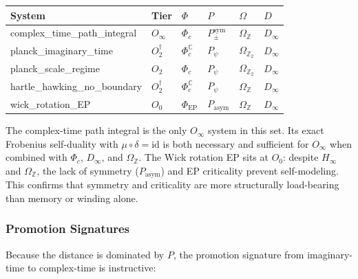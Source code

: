 \documentclass[12pt,a4paper]{article}
\begin{document}
\begin{table}[htbp]
\centering
\small
{}
\begin{tabularx}{\textwidth}{>{\centering\arraybackslash}X >{\centering\arraybackslash}X >{\centering\arraybackslash}X >{\centering\arraybackslash}X >{\centering\arraybackslash}X >{\centering\arraybackslash}X}
\toprule
\rowcolor{gray!25}\textbf{System} & \textbf{Tier} & \textbf{$\Phi$} & \textbf{$P$} & \textbf{$\Omega$} & \textbf{$D$} \\
\midrule
\rowcolors{1}{white}{gray!10}
complex\_time\_path\_integral & $O_{\infty}$ & $\Phi_c$ & $P_{\pm}^{\text{sym}}$ & $\Omega_\mathbb{Z}$ & $D_{\infty}$ \\
planck\_imaginary\_time & $O_2^\dagger$ & $\Phi_c^\mathbb{C}$ & $P_{\psi}$ & $\Omega_{\mathbb{Z}_2}$ & $D_{\infty}$ \\
planck\_scale\_regime & $O_2$ & $\Phi_c$ & $P_{\psi}$ & $\Omega_{\mathbb{Z}_2}$ & $D_{\infty}$ \\
hartle\_hawking\_no\_boundary & $O_2^\dagger$ & $\Phi_c^\mathbb{C}$ & $P_{\psi}$ & $\Omega_\mathbb{Z}$ & $D_{\infty}$ \\
wick\_rotation\_EP & $O_0$ & $\Phi_{\text{EP}}$ & $P_{\text{asym}}$ & $\Omega_\mathbb{Z}$ & $D_{\infty}$ \\
\bottomrule
\end{tabularx}
\end{table}

The complex-time path integral is the only $O_{\infty}$ system in this set. Its exact Frobenius self-duality with $\mu \circ \delta = \text{id}$ is both necessary and sufficient for $O_{\infty}$ when combined with $\Phi_c$, $D_{\infty}$, and $\Omega_\mathbb{Z}$. The Wick rotation EP sits at $O_0$: despite $H_{\infty}$ and $\Omega_\mathbb{Z}$, the lack of symmetry ($P_{\text{asym}}$) and EP criticality prevent self-modeling. This confirms that symmetry and criticality are more structurally load-bearing than memory or winding alone.

\subsubsection{Promotion Signatures}

Because the distance is dominated by $P$, the promotion signature from imaginary-time to complex-time is instructive:
\end{document}
